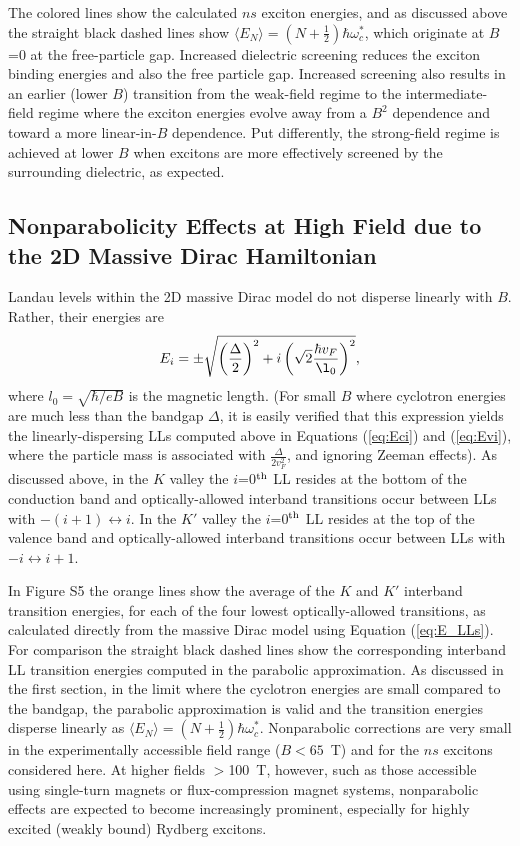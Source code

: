 \documentclass[aps,prl,twocolumn]{revtex4-1}
\begin{document}
The colored lines show the calculated $ns$ exciton energies, and as discussed above the straight black dashed lines show $\langle E_N \rangle = (N + \frac{1}{2})\hbar \omega_c^*$, which originate at $B$=0 at the free-particle gap. Increased dielectric screening reduces the exciton binding energies and also the free particle gap.  Increased screening also results in an earlier (lower $B$) transition from the weak-field regime to the intermediate-field regime where the exciton energies evolve away from a $B^2$ dependence and toward a more linear-in-$B$ dependence. Put differently, the strong-field regime is achieved at lower $B$ when excitons are more effectively screened by the surrounding dielectric, as expected. 

\subsection{Nonparabolicity Effects at High Field due to the 2D Massive Dirac Hamiltonian}

Landau levels within the 2D massive Dirac model do not disperse linearly with $B$. Rather, their energies are \cite{Rose}
%
\begin{equation}
E_i=\pm\sqrt{\left(\frac{\Delta}{2}\right)^2+i \left(\sqrt{2}\frac{\hbar v_F}{\l_0}\right)^2}, \label{eq:E_LLs}
\end{equation}
%
where $l_0=\sqrt{\hbar/eB}$ is the magnetic length. (For small $B$ where cyclotron energies are much less than the bandgap $\Delta$, it is easily verified that this expression yields the linearly-dispersing LLs computed above in Equations (\ref{eq:Eci}) and (\ref{eq:Evi}), where the particle mass is associated with $\frac{\Delta}{2 v_F^2}$, and ignoring Zeeman effects).  As discussed above, in the $K$ valley the $i$=0$^{\rm th}$ LL resides at the bottom of the conduction band and optically-allowed interband transitions occur between LLs with $-(i+1) \leftrightarrow i$. In the $K'$ valley the $i$=0$^{\rm th}$ LL resides at the top of the valence band and optically-allowed interband transitions occur between LLs with $-i \leftrightarrow i+1$. 

In Figure S5 the orange lines show the average of the $K$ and $K'$ interband transition energies, for each of the four lowest optically-allowed transitions, as calculated directly from the massive Dirac model using Equation (\ref{eq:E_LLs}). For comparison the straight black dashed lines show the corresponding interband LL transition energies computed in the parabolic approximation. As discussed in the first section, in the limit where the cyclotron energies are small compared to the bandgap, the parabolic approximation is valid and the transition energies disperse linearly as $\langle E_N \rangle = (N + \frac{1}{2})\hbar \omega_c^*$.  Nonparabolic corrections are very small in the experimentally accessible field range ($B<65$~T) and for the $ns$ excitons considered here.  At higher fields $>$100~T, however, such as those accessible using single-turn magnets or flux-compression magnet systems, nonparabolic effects are expected to become increasingly prominent, especially for highly excited (weakly bound) Rydberg excitons. 
  
\end{document}
